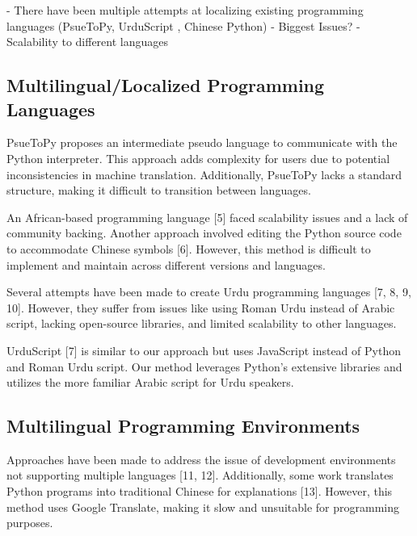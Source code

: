 \documentclass[conference]{IEEEtran}
\begin{document}
- There have been multiple attempts at localizing existing programming languages (PsueToPy, UrduScript \cite{Memon_UrduScript_2019}, Chinese Python)
  - Biggest Issues?
    - Scalability to different languages



\subsection{Multilingual/Localized Programming Languages}

PsueToPy \cite{IEEEexample:tamethebeast} proposes an intermediate pseudo language to communicate with the Python interpreter. This approach adds complexity for users due to potential inconsistencies in machine translation. Additionally, PsueToPy lacks a standard structure, making it difficult to transition between languages. 

An African-based programming language [5] faced scalability issues and a lack of community backing. Another approach involved editing the Python source code to accommodate Chinese symbols [6]. However, this method is difficult to implement and maintain across different versions and languages.

Several attempts have been made to create Urdu programming languages [7, 8, 9, 10]. However, they suffer from issues like using Roman Urdu instead of Arabic script, lacking open-source libraries, and limited scalability to other languages.

UrduScript [7] is similar to our approach but uses JavaScript instead of Python and Roman Urdu script. Our method leverages Python's extensive libraries and utilizes the more familiar Arabic script for Urdu speakers.

\subsection{Multilingual Programming Environments}

Approaches have been made to address the issue of development environments not supporting multiple languages [11, 12]. Additionally, some work translates Python programs into traditional Chinese for explanations [13]. However, this method uses Google Translate, making it slow and unsuitable for programming purposes.
\end{document}
